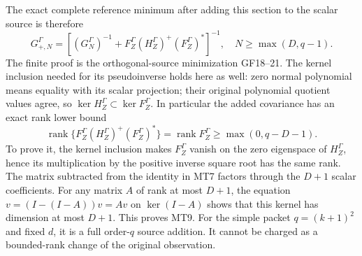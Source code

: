 \documentclass[11pt]{article}
\newcommand{\rank}{\operatorname{rank}}\newcommand{\Rea}{\operatorname{Re}}
\begin{document}
The exact complete reference minimum after adding this section to the
scalar source is therefore
\begin{equation}\tag{MT8}
 G^\Gamma_{+,N}=\left[(G^\Gamma_N)^{-1}+
 F_Z^\Gamma(H_Z^\Gamma)^+(F_Z^\Gamma)^*\right]^{-1},\quad N\ge\max(D,q-1).
\end{equation}
The finite proof is the orthogonal-source minimization GF18--21. The
kernel inclusion needed for its pseudoinverse holds here as well:
zero normal polynomial means equality with its scalar projection;
their original polynomial quotient values agree, so
$\ker H_Z^\Gamma\subset\ker F_Z^\Gamma$.
In particular the added covariance has an exact rank lower bound
\begin{equation}\tag{MT9}
 \rank\{F_Z^\Gamma(H_Z^\Gamma)^+(F_Z^\Gamma)^*\}
 =\rank F_Z^\Gamma\ge\max(0,q-D-1).
\end{equation}
To prove it, the kernel inclusion makes $F_Z^\Gamma$ vanish on the
zero eigenspace of $H_Z^\Gamma$, hence its multiplication by the
positive inverse square root has the same rank. The matrix subtracted
from the identity in MT7 factors through the $D+1$ scalar coefficients.
For any matrix $A$ of rank at most $D+1$, the equation
$v=(I-(I-A))v=Av$ on $\ker(I-A)$ shows that this kernel has dimension
at most $D+1$. This proves MT9. For the simple packet $q=(k+1)^2$ and
fixed $d$, it is a full order-$q$ source addition. It cannot be charged
as a bounded-rank change of the original observation.
\end{document}
